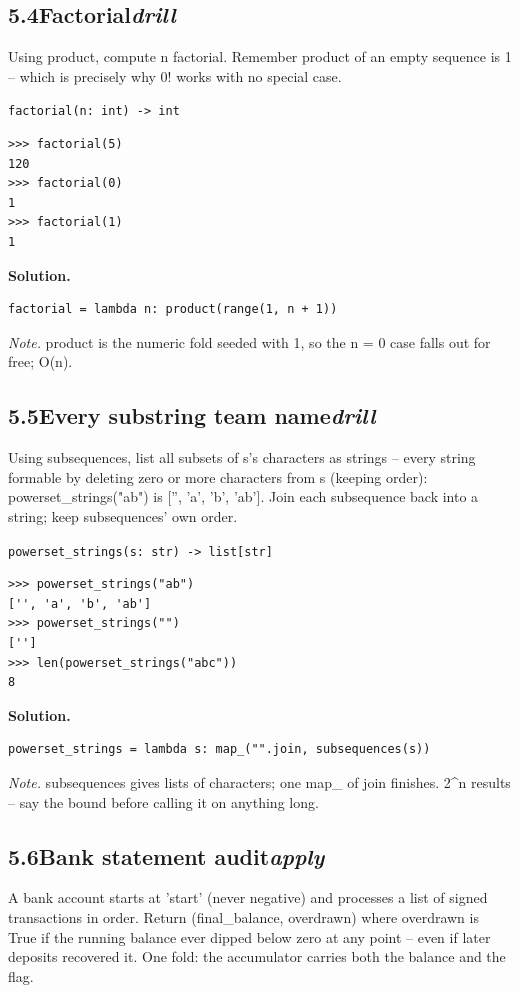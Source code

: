 \documentclass[10pt,letterpaper]{book}
\begin{document}
\subsection*{5.4\quad Factorial\hfill\textnormal{\textit{drill}}}
Using product, compute n factorial. Remember product of an empty sequence is 1 -- which is precisely why 0! works with no special case.

\noindent\texttt{factorial(n: int) -> int}
\begin{lstlisting}[style=ex]
>>> factorial(5)
120
>>> factorial(0)
1
>>> factorial(1)
1
\end{lstlisting}
\noindent\textbf{Solution.}
\begin{lstlisting}[style=code]
factorial = lambda n: product(range(1, n + 1))
\end{lstlisting}
\noindent\textit{Note.} product is the numeric fold seeded with 1, so the n = 0 case falls out for free; O(n).

\subsection*{5.5\quad Every substring team name\hfill\textnormal{\textit{drill}}}
Using subsequences, list all subsets of s's characters as strings -- every string formable by deleting zero or more characters from s (keeping order): powerset\_strings("ab") is ['', 'a', 'b', 'ab']. Join each subsequence back into a string; keep subsequences' own order.

\noindent\texttt{powerset\_strings(s: str) -> list[str]}
\begin{lstlisting}[style=ex]
>>> powerset_strings("ab")
['', 'a', 'b', 'ab']
>>> powerset_strings("")
['']
>>> len(powerset_strings("abc"))
8
\end{lstlisting}
\noindent\textbf{Solution.}
\begin{lstlisting}[style=code]
powerset_strings = lambda s: map_("".join, subsequences(s))
\end{lstlisting}
\noindent\textit{Note.} subsequences gives lists of characters; one map\_ of join finishes. 2\^{}n results -- say the bound before calling it on anything long.

\subsection*{5.6\quad Bank statement audit\hfill\textnormal{\textit{apply}}}
A bank account starts at 'start' (never negative) and processes a list of signed transactions in order. Return (final\_balance, overdrawn) where overdrawn is True if the running balance ever dipped below zero at any point -- even if later deposits recovered it. One fold: the accumulator carries both the balance and the flag.
\end{document}
